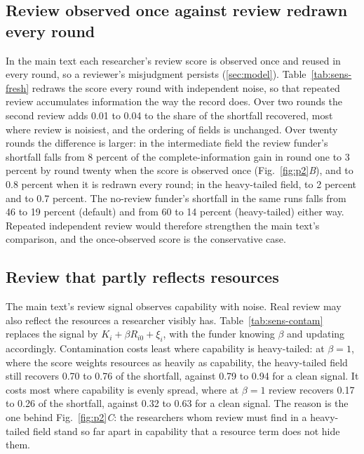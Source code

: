 

\subsection*{Review observed once against review redrawn every round}
In the main text each researcher's review score is observed once and reused in every round, so a reviewer's misjudgment persists (\ref{sec:model}). Table~\ref{tab:sens-fresh} redraws the score every round with independent noise, so that repeated review accumulates information the way the record does. Over two rounds the second review adds 0.01 to 0.04 to the share of the shortfall recovered, most where review is noisiest, and the ordering of fields is unchanged. Over twenty rounds the difference is larger: in the intermediate field the review funder's shortfall falls from 8 percent of the complete-information gain in round one to 3 percent by round twenty when the score is observed once (Fig.~\ref{fig:p2}\textit{B}), and to 0.8 percent when it is redrawn every round; in the heavy-tailed field, to 2 percent and to 0.7 percent. The no-review funder's shortfall in the same runs falls from 46 to 19 percent (default) and from 60 to 14 percent (heavy-tailed) either way. Repeated independent review would therefore strengthen the main text's comparison, and the once-observed score is the conservative case.



\subsection*{Review that partly reflects resources}
The main text's review signal observes capability with noise. Real review may also reflect the resources a researcher visibly has. Table~\ref{tab:sens-contam} replaces the signal by $K_i + \beta R_{i0} + \xi_i$, with the funder knowing $\beta$ and updating accordingly. Contamination costs least where capability is heavy-tailed: at $\beta = 1$, where the score weights resources as heavily as capability, the heavy-tailed field still recovers 0.70 to 0.76 of the shortfall, against 0.79 to 0.94 for a clean signal. It costs most where capability is evenly spread, where at $\beta = 1$ review recovers 0.17 to 0.26 of the shortfall, against 0.32 to 0.63 for a clean signal. The reason is the one behind Fig.~\ref{fig:p2}\textit{C}: the researchers whom review must find in a heavy-tailed field stand so far apart in capability that a resource term does not hide them.

